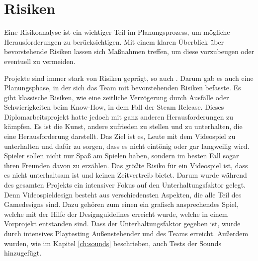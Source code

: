 
\section{Risiken}\label{sec:risiken}

\renewcommand{\kapitelautor}{Autor: Nils Hubmann}
%
Eine Risikoanalyse ist ein wichtiger Teil im Planungsprozess, um mögliche Herausforderungen zu berücksichtigen.
Mit einem klaren Überblick über bevorstehende Risiken lassen sich Maßnahmen treffen, um diese vorzubeugen oder eventuell zu vermeiden.

Projekte sind immer stark von Risiken geprägt, so auch \ff. Darum gab es auch eine Planungsphase, in der sich das Team mit bevorstehenden Risiken befasste.
Es gibt klassische Risiken, wie eine zeitliche Verzögerung durch Ausfälle oder Schwierigkeiten beim Know-How, in dem Fall der Steam Release.
Dieses Diplomarbeitsprojekt hatte jedoch mit ganz anderen Herausforderungen zu kämpfen. Es ist die Kunst, andere zufrieden zu stellen und zu unterhalten, die eine Herausforderung darstellt.
Das Ziel ist es, Leute mit dem Videospiel zu unterhalten und dafür zu sorgen, dass es nicht eintönig oder gar langweilig wird.
Spieler sollen nicht nur Spaß am Spielen haben, sondern im besten Fall sogar ihren Freunden davon zu erzählen.
Das größte Risiko für ein Videospiel ist, dass es nicht unterhaltsam ist und keinen Zeitvertreib bietet. Darum wurde während des gesamten Projekts ein intensiver Fokus auf den Unterhaltungsfaktor gelegt.
Denn Videospieldesign besteht aus verschiedensten Aspekten, die alle Teil des Gamedesigns sind.
Dazu gehören zum einen ein grafisch ansprechendes Spiel, welche mit der Hilfe der Designguidelines erreicht wurde, welche in einem Vorprojekt entstanden sind.
Dass der Unterhaltungsfaktor gegeben ist, wurde durch intensives Playtesting Außenstehender und des Teams erreicht.
Außerdem wurden, wie im Kapitel \ref{ch:sounds} beschrieben, auch Tests der Sounds hinzugefügt.
%

\renewcommand{\kapitelautor}{}

